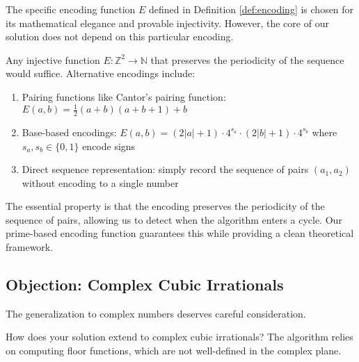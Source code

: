 \begin{response}
The specific encoding function $E$ defined in Definition \ref{def:encoding} is chosen for its mathematical elegance and provable injectivity. However, the core of our solution does not depend on this particular encoding.

Any injective function $E: \mathbb{Z}^2 \to \mathbb{N}$ that preserves the periodicity of the sequence would suffice. Alternative encodings include:
\begin{enumerate}
    \item Pairing functions like Cantor's pairing function: $E(a,b) = \frac{1}{2}(a+b)(a+b+1) + b$
    \item Base-based encodings: $E(a,b) = (2|a|+1) \cdot 4^{s_a} \cdot (2|b|+1) \cdot 4^{s_b}$ where $s_a, s_b \in \{0,1\}$ encode signs
    \item Direct sequence representation: simply record the sequence of pairs $(a_1, a_2)$ without encoding to a single number
\end{enumerate}

The essential property is that the encoding preserves the periodicity of the sequence of pairs, allowing us to detect when the \HAPD{} algorithm enters a cycle. Our prime-based encoding function guarantees this while providing a clean theoretical framework.
\end{response}

\subsection{Objection: Complex Cubic Irrationals}

The generalization to complex numbers deserves careful consideration.

\begin{objection}
How does your solution extend to complex cubic irrationals? The \HAPD{} algorithm relies on computing floor functions, which are not well-defined in the complex plane.
\end{objection}

